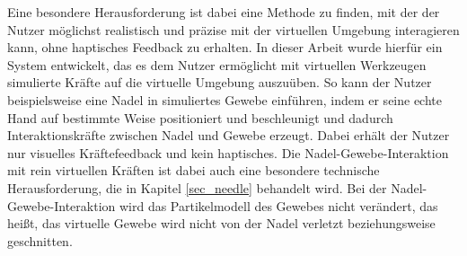 Eine besondere Herausforderung ist dabei eine Methode zu finden, mit der der Nutzer möglichst realistisch und präzise mit der virtuellen Umgebung interagieren kann, ohne haptisches Feedback zu erhalten. In dieser Arbeit wurde hierfür ein System entwickelt, das es dem Nutzer ermöglicht mit virtuellen Werkzeugen simulierte Kräfte auf die virtuelle Umgebung auszuüben. So kann der Nutzer beispielsweise eine Nadel in simuliertes Gewebe einführen, indem er seine echte Hand auf bestimmte Weise positioniert und beschleunigt und dadurch Interaktionskräfte zwischen Nadel und Gewebe erzeugt. 
Dabei erhält der Nutzer nur visuelles Kräftefeedback und kein haptisches. %
Die Nadel-Gewebe-Interaktion mit rein virtuellen Kräften ist dabei auch eine besondere technische Herausforderung, die in Kapitel \ref{sec_needle} behandelt wird. 
Bei der Nadel-Gewebe-Interaktion wird das Partikelmodell des Gewebes nicht verändert, das heißt, das virtuelle Gewebe wird nicht von der Nadel verletzt beziehungsweise geschnitten.




